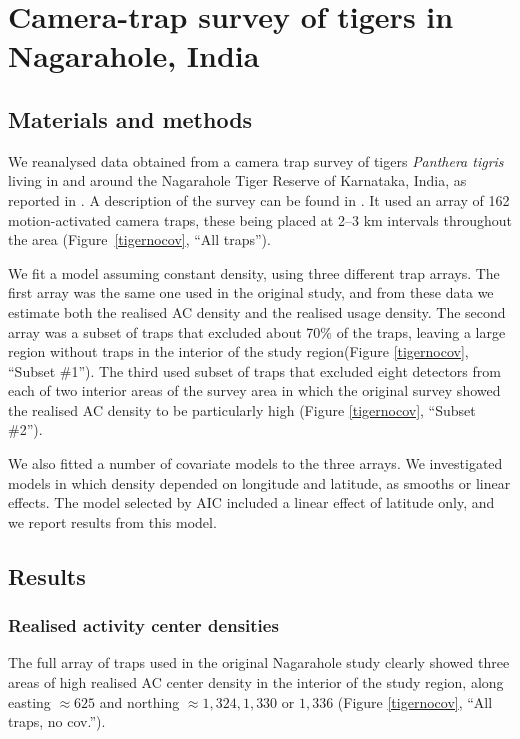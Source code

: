 \documentclass[10pt,a4paper]{article}
\begin{document}
\section{Camera-trap survey of tigers in Nagarahole, India}

\subsection{Materials and methods}
We reanalysed data obtained from a camera trap survey of tigers {\it Panthera tigris} living in and around the Nagarahole Tiger Reserve of Karnataka, India, as reported in \cite{Dorazio+Karanth:17}. A description of the survey can be found in  \cite{Dorazio+Karanth:17}. It used an array of 162 motion-activated camera traps, these being placed at 2–3 km intervals throughout the area (Figure~\ref{tigernocov}, ``All traps''). 

We fit a model assuming constant density, using three different trap arrays. The first array was the same one used in the original study, and from these data we estimate both the realised AC density and the realised usage density. The second array was a subset of traps that excluded about 70\% of the traps, leaving a large region without traps in the interior of the study region(Figure \ref{tigernocov}, ``Subset \#1''). The third used subset of traps that excluded eight detectors from each of two interior areas of the survey area in which the original survey showed the realised AC density to be particularly high (Figure \ref{tigernocov}, ``Subset \#2''). 

We also fitted a number of covariate models to the three arrays. We investigated models in which density depended on longitude and latitude, as smooths or linear effects. The model selected by AIC included a linear effect of latitude only, and we report results from this model. 


\subsection{Results} 

\subsubsection{Realised activity center densities}

The full array of traps used in the original Nagarahole study clearly showed three areas of high realised AC center density in the interior of the study region, along easting $\approx 625$ and northing $\approx 1,324, 1,330$ or $1,336$ (Figure \ref{tigernocov}, ``All traps, no cov.''). 
\end{document}
